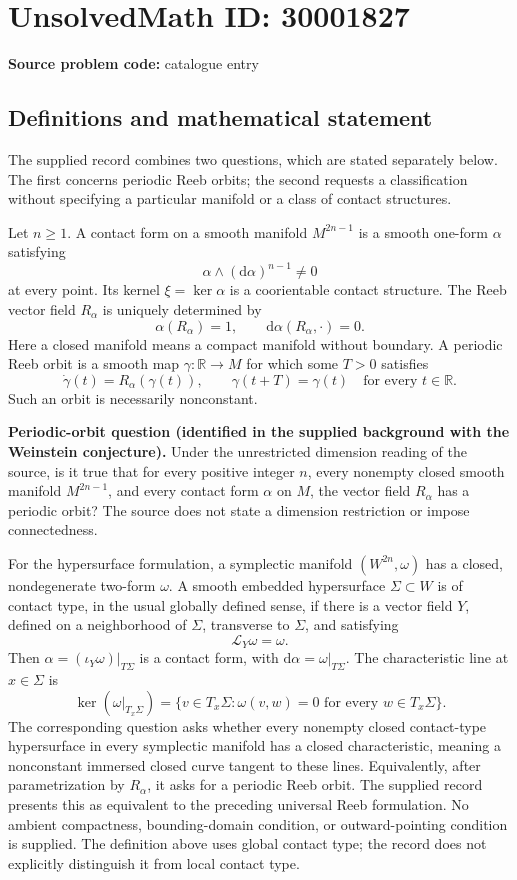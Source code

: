 \documentclass[11pt]{article}
\newcommand{\R}{\mathbb{R}}
\begin{document}
\section*{UnsolvedMath ID: 30001827}
\textbf{Source problem code:} catalogue entry
\subsection{Definitions and mathematical statement}
The supplied record combines two questions, which are stated separately below. The first concerns periodic Reeb orbits; the second requests a classification without specifying a particular manifold or a class of contact structures.

Let \(n\geq 1\). A contact form on a smooth manifold \(M^{2n-1}\) is a smooth one-form \(\alpha\) satisfying
\[
\alpha\wedge(\mathrm d\alpha)^{n-1}\neq 0
\]
at every point. Its kernel \(\xi=\ker\alpha\) is a coorientable contact structure. The Reeb vector field \(R_\alpha\) is uniquely determined by
\[
\alpha(R_\alpha)=1,\qquad \mathrm d\alpha(R_\alpha,\cdot)=0.
\]
Here a closed manifold means a compact manifold without boundary. A periodic Reeb orbit is a smooth map \(\gamma:\R\to M\) for which some \(T>0\) satisfies
\[
\dot\gamma(t)=R_\alpha(\gamma(t)),\qquad
\gamma(t+T)=\gamma(t)\quad\text{for every }t\in\R.
\]
Such an orbit is necessarily nonconstant.

\textbf{Periodic-orbit question (identified in the supplied background with the Weinstein conjecture).} Under the unrestricted dimension reading of the source, is it true that for every positive integer \(n\), every nonempty closed smooth manifold \(M^{2n-1}\), and every contact form \(\alpha\) on \(M\), the vector field \(R_\alpha\) has a periodic orbit? The source does not state a dimension restriction or impose connectedness.

For the hypersurface formulation, a symplectic manifold \((W^{2n},\omega)\) has a closed, nondegenerate two-form \(\omega\). A smooth embedded hypersurface \(\Sigma\subset W\) is of contact type, in the usual globally defined sense, if there is a vector field \(Y\), defined on a neighborhood of \(\Sigma\), transverse to \(\Sigma\), and satisfying
\[
\mathcal L_Y\omega=\omega.
\]
Then \(\alpha=(\iota_Y\omega)|_{T\Sigma}\) is a contact form, with \(\mathrm d\alpha=\omega|_{T\Sigma}\). The characteristic line at \(x\in\Sigma\) is
\[
\ker(\omega|_{T_x\Sigma})
=\{v\in T_x\Sigma:\omega(v,w)=0\text{ for every }w\in T_x\Sigma\}.
\]
The corresponding question asks whether every nonempty closed contact-type hypersurface in every symplectic manifold has a closed characteristic, meaning a nonconstant immersed closed curve tangent to these lines. Equivalently, after parametrization by \(R_\alpha\), it asks for a periodic Reeb orbit. The supplied record presents this as equivalent to the preceding universal Reeb formulation. No ambient compactness, bounding-domain condition, or outward-pointing condition is supplied. The definition above uses global contact type; the record does not explicitly distinguish it from local contact type.
\end{document}

